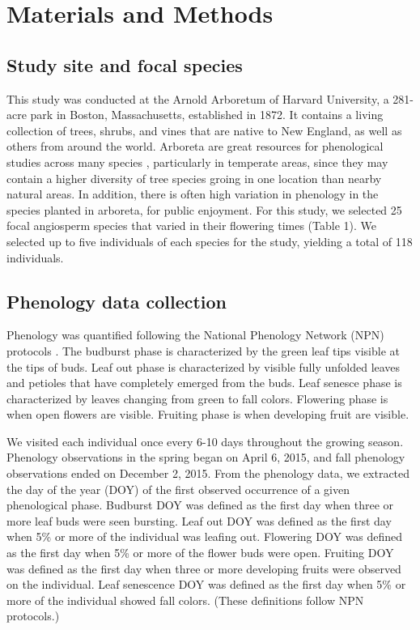 \documentclass{article}
\begin{document}
\section* {Materials and Methods}
\subsection*{Study site and focal species}
This study was conducted at the Arnold Arboretum of Harvard University, a 281-acre park in Boston, Massachusetts, established in 1872. It contains a living collection of trees, shrubs, and vines that are native to New England, as well as others from around the world. Arboreta are great resources for phenological studies across many species \citep{primack2009a}, particularly in temperate areas, since they may contain a higher diversity of tree species groing in one location than nearby natural areas. In addition, there is often high variation in phenology in the species planted in arboreta, for public enjoyment. For this study, we selected 25 focal angiosperm species that varied in their flowering times (Table 1). We selected up to five individuals of each species for the study, yielding a total of 118 individuals.

\subsection*{Phenology data collection}
Phenology was quantified following the National Phenology Network (NPN) protocols \citep{denny2014}. The budburst phase is characterized by the green leaf tips visible at the tips of buds. Leaf out phase is characterized by visible fully unfolded leaves and petioles that have completely emerged from the buds. Leaf senesce phase is characterized by leaves changing from green to fall colors. Flowering phase is when open flowers are visible. Fruiting phase is when developing fruit are visible. 
\par We visited each individual once every 6-10 days throughout the growing season. Phenology observations in the spring began on April 6, 2015, and fall phenology observations ended on December 2, 2015.
From the phenology data, we extracted the day of the year (DOY) of the first observed occurrence of a given phenological phase. Budburst DOY was defined as the first day when three or more leaf buds were seen bursting. Leaf out DOY was defined as the first day when 5\% or more of the individual was leafing out. Flowering DOY was defined as the first day when 5\% or more of the flower buds were open. Fruiting DOY was defined as the first day when three or more developing fruits were observed on the individual. Leaf senescence DOY was defined as the first day when 5\% or more of the individual showed fall colors. (These definitions follow NPN protocols.)
\end{document}

